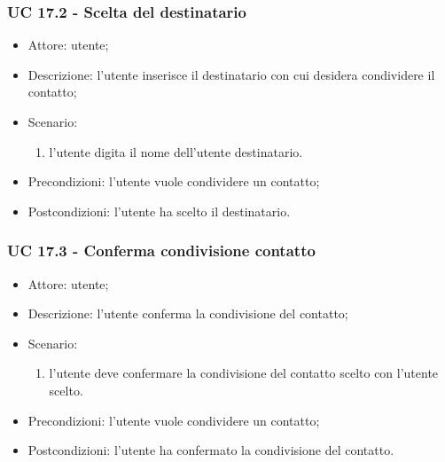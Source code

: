 \subsubsection{UC 17.2 - Scelta del destinatario} \label{sec: UC 17.2}
\begin{itemize}
    \item Attore: utente;
    \item Descrizione: l'utente inserisce il destinatario con cui desidera condividere il contatto;
    \item Scenario:
        \begin{enumerate}
        \item l'utente digita il nome dell'utente destinatario.
        \end{enumerate}
    
    \item Precondizioni: l'utente vuole condividere un contatto;
    \item Postcondizioni: l'utente ha scelto il destinatario.
\end{itemize}


\subsubsection{UC 17.3 - Conferma condivisione contatto} \label{sec: UC 17.3}
\begin{itemize}
    \item Attore: utente;
    \item Descrizione: l'utente conferma la condivisione del contatto;
    \item Scenario:
        \begin{enumerate}
        \item l'utente deve confermare la condivisione del contatto scelto con l'utente scelto.
        \end{enumerate}
    
    \item Precondizioni: l'utente vuole condividere un contatto;
    \item Postcondizioni: l'utente ha confermato la condivisione del contatto.
\end{itemize}

